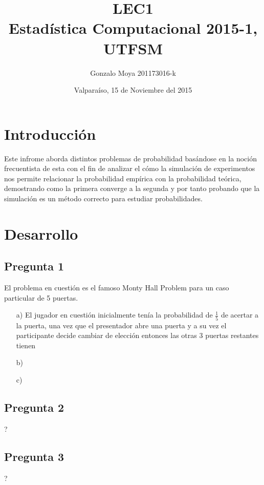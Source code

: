\documentclass[letter,10pt]{article}
\title{LEC1 \\ Estadística Computacional 2015-1, UTFSM }
\author{Gonzalo Moya 201173016-k}
\date{\vspace*{1cm} Valparaíso, 15 de Noviembre del 2015}
\begin{document}
\maketitle
\thispagestyle{empty}
\newpage
\tableofcontents

\makeatother

\newpage

\section{Introducción}

Este infrome aborda distintos problemas de probabilidad basándose en la noción frecuentista de esta con el fin de analizar
el cómo la simulación de experimentos nos permite relacionar la probabilidad empírica con la probabilidad teórica, demostrando como la
primera converge a la segunda y por tanto probando que la simulación es un método correcto para estudiar probabilidades.


\section{Desarrollo}
\subsection{Pregunta 1}
El problema en cuestión es el famoso Monty Hall Problem para un caso particular de 5 puertas.
\begin{itemize}
 \item[a)] El jugador en cuestión inicialmente tenía la probabilidad de $\frac{1}{5}$ de acertar a la puerta, una vez que el presentador
 abre una puerta y a su vez el participante decide cambiar de elección entonces las otras 3 puertas restantes tienen 
 \item[b)]
 \item[c)]
\end{itemize}

\subsection{Pregunta 2}
?
\subsection{Pregunta 3}
?
\end{document}
